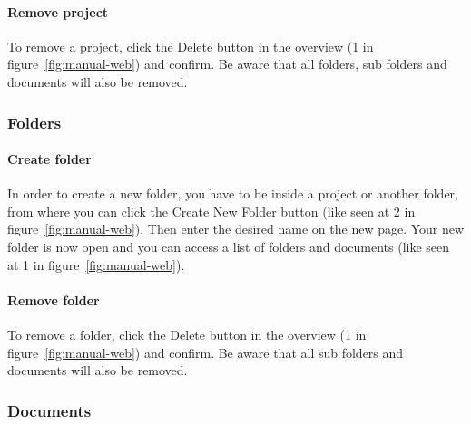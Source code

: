 	\paragraph{Remove project}
	To remove a project, click the Delete button in the overview (1 in figure~\ref{fig:manual-web}) and confirm. Be aware that all folders, sub folders and documents will also be removed.

\subsubsection{Folders}

	\paragraph{Create folder}
	In order to create a new folder, you have to be inside a project or another folder, from where you can click the Create New Folder button (like seen at 2 in figure~\ref{fig:manual-web}). Then enter the desired name on the new page. Your new folder is now open and you can access a list of folders and documents (like seen at 1 in figure~\ref{fig:manual-web}).

	\paragraph{Remove folder}
	To remove a folder, click the Delete button in the overview (1 in figure~\ref{fig:manual-web}) and confirm. Be aware that all sub folders and documents will also be removed.

\subsubsection{Documents}
	
